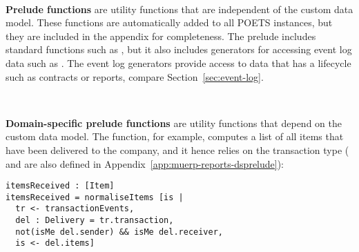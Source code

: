 ~

\noindent\textbf{Prelude functions} are utility functions that are
independent of the custom data model. These functions are
automatically added to all POETS instances, but they are included in
the appendix for completeness. The prelude includes standard functions
such as , but it also includes generators for accessing
event log data such as . The event log generators provide
access to data that has a lifecycle such as contracts or reports,
compare Section~\ref{sec:event-log}.

~

\noindent\textbf{Domain-specific prelude functions} are utility
functions that depend on the custom data model. The
 function, for example, computes a list of all
items that have been delivered to the company, and it hence relies on
the  transaction type ( and
 are also defined in
Appendix~\ref{app:muerp-reports-dsprelude}):
\begin{lstlisting}[language=parrot,basicstyle=\small]
itemsReceived : [Item]
itemsReceived = normaliseItems [is |
  tr <- transactionEvents,
  del : Delivery = tr.transaction,
  not(isMe del.sender) && isMe del.receiver,
  is <- del.items]
\end{lstlisting}

~

